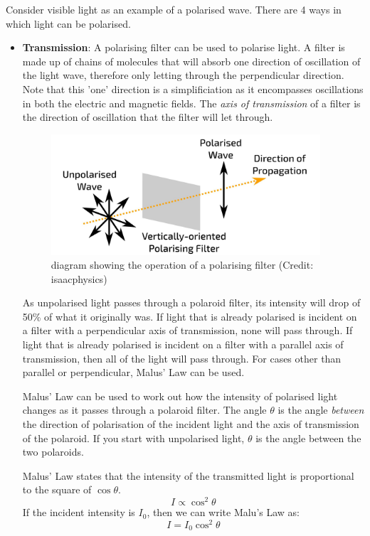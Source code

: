 \documentclass[main.tex]{subfiles}
\begin{document}
Consider visible light as an example of a polarised wave. There are 4 ways in which light can be polarised.

\begin{itemize}
\item\textbf{Transmission}: A polarising filter can be used to polarise light. A filter is made up of chains of molecules that will absorb one direction of oscillation of the light wave, therefore only letting through the perpendicular direction. Note that this 'one' direction is a simplificiation as it encompasses oscillations in both the electric and magnetic fields. The \emph{axis of transmission} of a filter is the direction of oscillation that the filter will let through.

\begin{figure}[h]
\includegraphics[width=10cm]{figs/chapt-6/polarisedwave.JPG}
\centering
\caption{diagram showing the operation of a polarising filter (Credit: isaacphysics)}
\end{figure}

As unpolarised light passes through a polaroid filter, its intensity will drop of 50\% of what it originally was. If light that is already polarised is incident on a filter with a perpendicular axis of transmission, none will pass through. If light that is already polarised is incident on a filter with a parallel axis of transmission, then all of the light will pass through. For cases other than parallel or perpendicular, Malus' Law can be used.

Malus' Law can be used to work out how the intensity of polarised light changes as it passes through a polaroid filter. The angle $\theta$ is the angle \emph{between} the direction of polarisation of the incident light and the axis of transmission of the polaroid. If you start with unpolarised light, $\theta$ is the angle between the two polaroids.

Malus' Law states that the intensity of the transmitted light is proportional to the square of $\cos\theta$.
$$I \propto \cos^2\theta $$
If the incident intensity is $I_0$, then we can write Malu's Law as:
$$I = I_0\cos^2\theta$$


\end{itemize}
\end{document}
